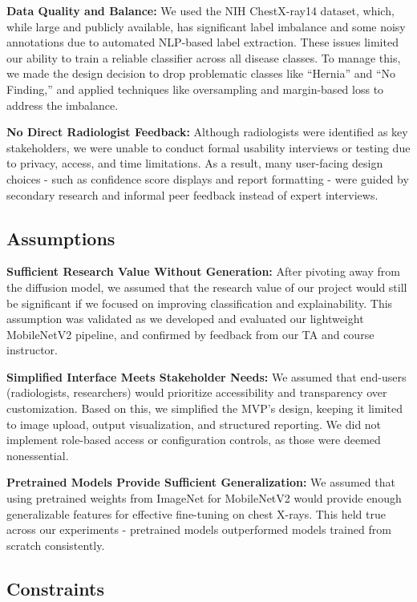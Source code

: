 \documentclass{article}
\begin{document}
\textbf{Data Quality and Balance:} We used the NIH ChestX-ray14 dataset, which, while large and publicly available, has significant label imbalance and some noisy annotations due to automated NLP-based label extraction. These issues limited our ability to train a reliable classifier across all disease classes. To manage this, we made the design decision to drop problematic classes like ``Hernia'' and ``No Finding,'' and applied techniques like oversampling and margin-based loss to address the imbalance.

\textbf{No Direct Radiologist Feedback:} Although radiologists were identified as key stakeholders, we were unable to conduct formal usability interviews or testing due to privacy, access, and time limitations. As a result, many user-facing design choices - such as confidence score displays and report formatting - were guided by secondary research and informal peer feedback instead of expert interviews.

\subsection*{Assumptions}

\textbf{Sufficient Research Value Without Generation:} After pivoting away from the diffusion model, we assumed that the research value of our project would still be significant if we focused on improving classification and explainability. This assumption was validated as we developed and evaluated our lightweight MobileNetV2 pipeline, and confirmed by feedback from our TA and course instructor.

\textbf{Simplified Interface Meets Stakeholder Needs:} We assumed that end-users (radiologists, researchers) would prioritize accessibility and transparency over customization. Based on this, we simplified the MVP's design, keeping it limited to image upload, output visualization, and structured reporting. We did not implement role-based access or configuration controls, as those were deemed nonessential.

\textbf{Pretrained Models Provide Sufficient Generalization:} We assumed that using pretrained weights from ImageNet for MobileNetV2 would provide enough generalizable features for effective fine-tuning on chest X-rays. This held true across our experiments - pretrained models outperformed models trained from scratch consistently.

\subsection*{Constraints}
\end{document}
